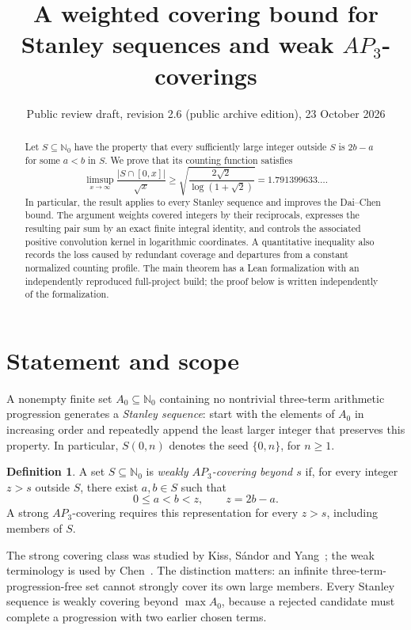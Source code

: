 \documentclass[11pt]{article}
\title{A weighted covering bound for\protect\\Stanley sequences and weak $AP_3$-coverings}
\author{}
\date{Public review draft, revision 2.6 (public archive edition), 23 October 2026}
\theoremstyle{definition}\newtheorem{definition}[theorem]{Definition}
\theoremstyle{remark}\newtheorem{remark}[theorem]{Remark}
\numberwithin{equation}{section}
\newcommand{\N}{\mathbb N_0}
\begin{document}
\maketitle
\thispagestyle{fancy}
\begin{abstract}
Let $S\subseteq\N$ have the property that every sufficiently large integer outside $S$ is $2b-a$ for some $a<b$ in $S$. We prove that its counting function satisfies
\[
\limsup_{x\to\infty}\frac{|S\cap[0,x]|}{\sqrt x}
\ge \sqrt{\frac{2\sqrt2}{\log(1+\sqrt2)}}=1.791399633\ldots.
\]
In particular, the result applies to every Stanley sequence and improves the Dai--Chen bound. The argument weights covered integers by their reciprocals, expresses the resulting pair sum by an exact finite integral identity, and controls the associated positive convolution kernel in logarithmic coordinates. A quantitative inequality also records the loss caused by redundant coverage and departures from a constant normalized counting profile. The main theorem has a Lean formalization with an independently reproduced full-project build; the proof below is written independently of the formalization.
\end{abstract}

\section{Statement and scope}
A nonempty finite set $A_0\subseteq\N$ containing no nontrivial three-term arithmetic progression generates a \emph{Stanley sequence}: start with the elements of $A_0$ in increasing order and repeatedly append the least larger integer that preserves this property. In particular, $S(0,n)$ denotes the seed $\{0,n\}$, for $n\ge1$.

\begin{definition}
A set $S\subseteq\N$ is \emph{weakly $AP_3$-covering beyond $s$} if, for every integer $z>s$ outside $S$, there exist $a,b\in S$ such that
\[
0\le a<b<z,\qquad z=2b-a.
\]
A strong $AP_3$-covering requires this representation for every $z>s$, including members of $S$.
\end{definition}
The strong covering class was studied by Kiss, S\'andor and Yang~\cite{KSY}; the weak terminology is used by Chen~\cite{Chen}. The distinction matters: an infinite three-term-progression-free set cannot strongly cover its own large members. Every Stanley sequence is weakly covering beyond $\max A_0$, because a rejected candidate must complete a progression with two earlier chosen terms.
\end{document}
